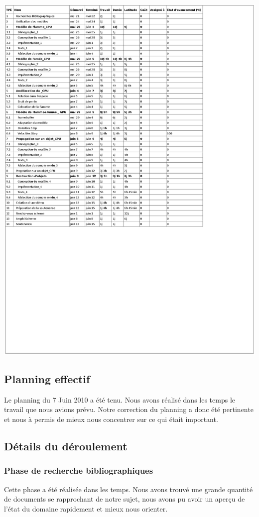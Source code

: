 \documentclass[a4paper,10pt]{article}
\begin{document}
        \includegraphics[scale=0.8]{../Planning/Planning2.ps}




\subsection{Planning effectif}
Le planning du 7 Juin 2010 a été tenu. Nous avons réalisé dans les temps le travail que nous avions
prévu. Notre correction du planning a donc été pertinente et nous à permis de mieux
nous concentrer sur ce qui était important. 



        
\subsection{Détails du déroulement}
\subsubsection{Phase de recherche bibliographiques}
Cette phase a été réalisée dans les temps. Nous avons trouvé une grande quantité de documents
se rapprochant de notre sujet, nous avons pu avoir un aperçu de l'état du domaine rapidement et mieux nous orienter.
\end{document}
